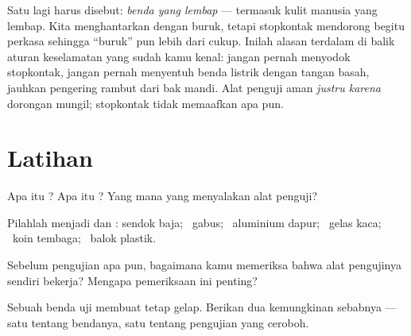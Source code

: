 \begin{remark}\label{rem:g4:conductors-insulators:safety}
Satu  lagi harus disebut: \emph{benda yang lembap} ---
termasuk kulit manusia yang lembap. Kita menghantarkan dengan buruk,
tetapi stopkontak mendorong begitu perkasa sehingga ``buruk'' pun
lebih dari cukup. Inilah alasan terdalam di balik aturan keselamatan
yang sudah kamu kenal: jangan pernah menyodok stopkontak, jangan
pernah menyentuh benda listrik dengan tangan basah, jauhkan pengering
rambut dari bak mandi. Alat penguji  aman \emph{justru karena}
dorongan  mungil; stopkontak tidak memaafkan apa pun.
\end{remark}

\section{Latihan}

\begin{exercise}[$\star$]\label{exo:g4:conductors-insulators:1}
Apa itu ? Apa itu ? Yang mana yang menyalakan 
alat penguji?
\end{exercise}

\begin{exercise}[$\star$]\label{exo:g4:conductors-insulators:2}
Pilahlah menjadi  dan : sendok baja; \ gabus; \ aluminium dapur; \
gelas kaca; \ koin tembaga; \ balok plastik.
\end{exercise}

\begin{exercise}[$\star$]\label{exo:g4:conductors-insulators:3}
Sebelum pengujian apa pun, bagaimana kamu memeriksa bahwa alat
pengujinya sendiri bekerja? Mengapa pemeriksaan ini penting?
\end{exercise}

\begin{exercise}[$\star$]\label{exo:g4:conductors-insulators:4}
Sebuah benda uji membuat  tetap gelap. Berikan dua
kemungkinan sebabnya --- satu tentang bendanya, satu tentang pengujian
yang ceroboh.
\end{exercise}

